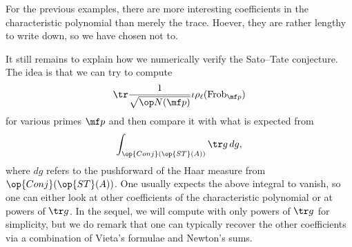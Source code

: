 \documentclass[../thesis.tex]{subfiles}
\begin{document}
\begin{remark}
	For the previous examples, there are more interesting coefficients in the characteristic polynomial than merely the trace. Hoever, they are rather lengthy to write down, so we have chosen not to.
\end{remark}
It still remains to explain how we numerically verify the Sato--Tate conjecture. The idea is that we can try to compute
\[\tr\frac1{\sqrt{\op N(\mf p)}}\iota\rho_\ell(\mathrm{Frob}_{\mf p})\]
for various primes $\mf p$ and then compare it with what is expected from
\[\int_{\op{Conj}(\op{ST}(A))}\tr g\,dg,\]
where $dg$ refers to the pushforward of the Haar measure from $\op{Conj}(\op{ST}(A))$. One usually expects the above integral to vanish, so one can either look at other coefficients of the characteristic polynomial or at powers of $\tr g$. In the sequel, we will compute with only powers of $\tr g$ for simplicity, but we do remark that one can typically recover the other coefficients via a combination of Vieta's formulae and Newton's sums.
\end{document}
